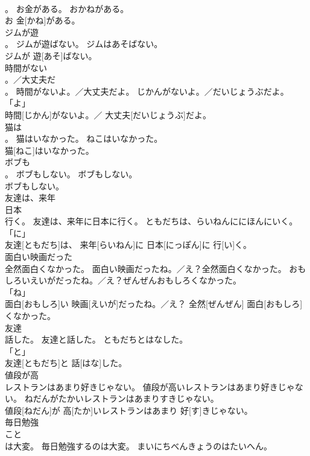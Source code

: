 \documentclass[8pt]{extreport}
\begin{document}
\begin{CJK}{UTF8}{min}
\\	。	お金がある。	おかねがある。	
\\	お 金[かね]がある。		
\\	ジムが遊
\\	。	ジムが遊ばない。	ジムはあそばない。	
\\	ジムが 遊[あそ]ばない。		
\\	時間がない
\\	。／大丈夫だ
\\	。	時間がないよ。／大丈夫だよ。	じかんがないよ。／だいじょうぶだよ。	
\\	「よ」 
\\	時間[じかん]がないよ。／ 大丈夫[だいじょうぶ]だよ。		
\\	猫は
\\	。	猫はいなかった。	ねこはいなかった。	
\\	猫[ねこ]はいなかった。		
\\	ボブも
\\	。	ボブもしない。	ボブもしない。	
\\	ボブもしない。		
\\	友達は、来年
\\	日本
\\	行く。	友達は、来年に日本に行く。	ともだちは、らいねんににほんにいく。	
\\	「に」 
\\	友達[ともだち]は、 来年[らいねん]に 日本[にっぽん]に 行[い]く。		
\\	面白い映画だった
\\	全然面白くなかった。	面白い映画だったね。／え？全然面白くなかった。	おもしろいえいがだったね。／え？ぜんぜんおもしろくなかった。	
\\	「ね」 
\\	面白[おもしろ]い 映画[えいが]だったね。／え？ 全然[ぜんぜん] 面白[おもしろ]くなかった。		
\\	友達
\\	話した。	友達と話した。	ともだちとはなした。	
\\	「と」 
\\	友達[ともだち]と 話[はな]した。		
\\	値段が高
\\	レストランはあまり好きじゃない。	値段が高いレストランはあまり好きじゃない。	ねだんがたかいレストランはあまりすきじゃない。	
\\	値段[ねだん]が 高[たか]いレストランはあまり 好[す]きじゃない。		
\\	毎日勉強
\\	こと
\\	は大変。	毎日勉強するのは大変。	まいにちべんきょうのはたいへん。	

\end{CJK}
\end{document}
